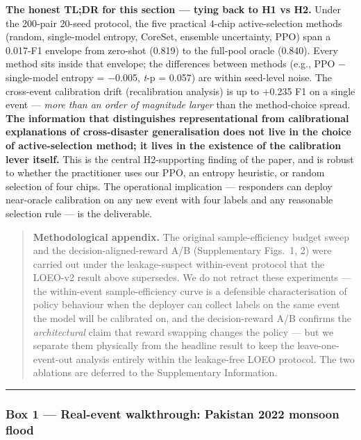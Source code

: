 \documentclass[sn-nature,lineno]{sn-jnl}
\theoremstyle{thmstyleone}
\theoremstyle{thmstyletwo}
\theoremstyle{thmstylethree}
\begin{document}
\textbf{The honest TL;DR for this section --- tying back to H1 vs H2.} Under
the 200-pair 20-seed protocol, the five practical 4-chip
active-selection methods (random, single-model entropy, CoreSet,
ensemble uncertainty, PPO) span a 0.017-F1 envelope from zero-shot
(0.819) to the full-pool oracle (0.840). Every method sits inside that
envelope; the differences between methods (e.g., PPO $-$ single-model
entropy = $-$0.005, \emph{t}-p = 0.057) are within seed-level noise. The
cross-event calibration drift (recalibration analysis) is up to +0.235 F1 on a single
event --- \emph{more than an order of magnitude larger} than the method-choice
spread. \textbf{The information that distinguishes representational from
calibrational explanations of cross-disaster generalisation does not
live in the choice of active-selection method; it lives in the
existence of the calibration lever itself.} This is the central
H2-supporting finding of the paper, and is robust to whether the
practitioner uses our PPO, an entropy heuristic, or random selection
of four chips. The operational implication --- responders can deploy
near-oracle calibration on any new event with four labels and any
reasonable selection rule --- is the deliverable.

\begin{quote}
\textbf{Methodological appendix.} The original sample-efficiency budget sweep
and the decision-aligned-reward A/B (Supplementary Figs.~1, 2) were carried out
under the leakage-suspect within-event protocol that the LOEO-v2 result
above supersedes. We do not retract these experiments --- the within-event
sample-efficiency curve is a defensible characterisation of policy
behaviour when the deployer can collect labels on the same event the
model will be calibrated on, and the decision-reward A/B confirms the
\emph{architectural} claim that reward swapping changes the policy --- but we
separate them physically from the headline result to keep the leave-one-event-out analysis entirely
within the leakage-free LOEO protocol. The two ablations are deferred to
the Supplementary Information.
\end{quote}

\begin{center}\rule{0.5\linewidth}{0.5pt}\end{center}

\subsubsection{Box 1 --- Real-event walkthrough: Pakistan 2022 monsoon flood}\label{box-1-real-event-walkthrough-pakistan-2022-monsoon-flood}
\end{document}
